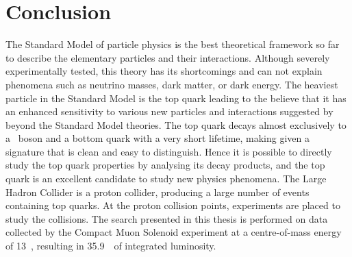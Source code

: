 \section{Conclusion}
The Standard Model of particle physics is the best theoretical framework so far to describe the elementary particles and their interactions. Although severely experimentally tested, this theory has its shortcomings and can not explain phenomena such as neutrino masses, dark matter, or dark energy. The heaviest particle in the Standard Model is the top quark leading to the believe that it has an enhanced sensitivity to various new particles and interactions suggested by beyond the Standard Model theories. The top quark decays almost exclusively to a \PW\ boson and a bottom quark with a very short lifetime, making given a signature that is clean and easy to distinguish. Hence it is possible to directly study the top quark properties by analysing its decay products, and the top quark is an excellent candidate to study new physics phenomena. The Large Hadron Collider is a proton collider, producing a large number of events containing top quarks. At the proton collision points, experiments are placed to study the collisions. The search presented in this thesis is performed on data collected by the Compact Muon Solenoid experiment at a centre-of-mass energy of 13~\TeV, resulting in 35.9~\fbinv\ of integrated luminosity. 


